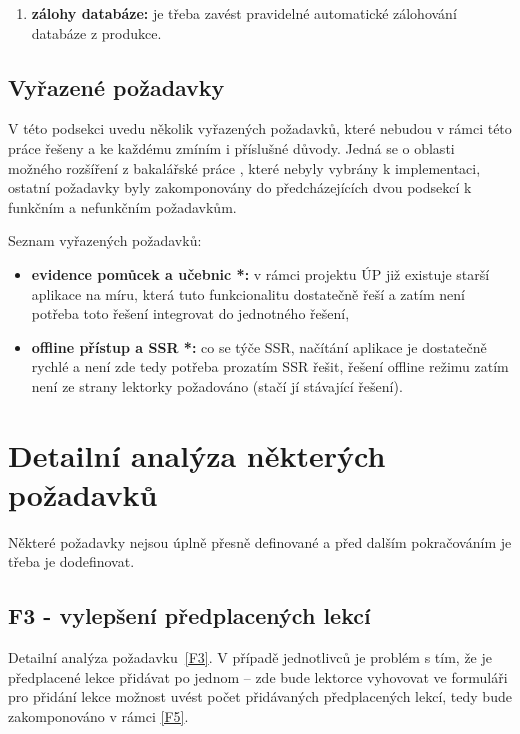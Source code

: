 \begin{enumerate}[label=\textbf{N\arabic*}]
    \item \label{N8} \textbf{zálohy databáze:} je třeba zavést pravidelné automatické zálohování databáze z produkce.
\end{enumerate}

\subsection{Vyřazené požadavky}\label{subsec:vyrazenepozadavky}

V této podsekci uvedu několik vyřazených požadavků, které nebudou v rámci této práce řešeny a ke každému zmíním i příslušné důvody. Jedná se o oblasti možného rozšíření z bakalářské práce \cite{bp}, které nebyly vybrány k implementaci, ostatní požadavky byly zakomponovány do předcházejících dvou podsekcí k funkčním a nefunkčním požadavkům.

Seznam vyřazených požadavků:
\begin{itemize}
    \item \textbf{evidence pomůcek a učebnic *:} v rámci projektu ÚP již existuje starší aplikace na míru, která tuto funkcionalitu dostatečně řeší a zatím není potřeba toto řešení integrovat do jednotného řešení,
    \item \textbf{offline přístup a SSR *:} co se týče SSR, načítání aplikace je dostatečně rychlé a není zde tedy potřeba prozatím SSR řešit, řešení offline režimu zatím není ze strany lektorky požadováno (stačí jí stávající řešení).
\end{itemize}

\section{Detailní analýza některých požadavků}

Některé požadavky nejsou úplně přesně definované a před dalším pokračováním je třeba je dodefinovat.

\subsection{F3 - vylepšení předplacených lekcí}\label{subsec:F3detail}

Detailní analýza požadavku~\ref{F3}.
V případě jednotlivců je problém s tím, že je předplacené lekce přidávat po jednom -- zde bude lektorce vyhovovat ve formuláři pro přidání lekce možnost uvést počet přidávaných předplacených lekcí, tedy bude zakomponováno v rámci \ref{F5}.

